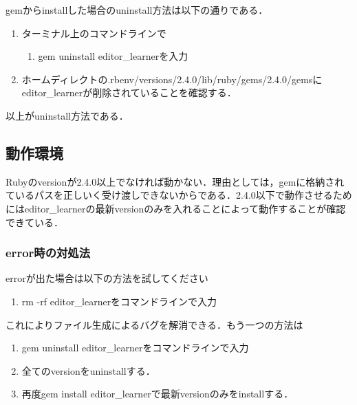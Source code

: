 \documentclass[11pt,dvipdfmx]{jsarticle}
\providecommand{\tightlist}{%
      \setlength{\itemsep}{0pt}\setlength{\parskip}{0pt}}
\begin{document}
gemからinstallした場合のuninstall方法は以下の通りである．

\begin{enumerate}
\def\labelenumi{\arabic{enumi}.}
\tightlist
\item
  ターミナル上のコマンドラインで

  \begin{enumerate}
  \def\labelenumii{\arabic{enumii}.}
  \setcounter{enumii}{1}
  \tightlist
  \item
    gem uninstall editor\_learnerを入力
  \end{enumerate}
\item
  ホームディレクトの.rbenv/versions/2.4.0/lib/ruby/gems/2.4.0/gemsにeditor\_learnerが削除されていることを確認する．
\end{enumerate}

以上がuninstall方法である．

    \subsection{動作環境}\label{ux52d5ux4f5cux74b0ux5883}

    Rubyのversionが2.4.0以上でなければ動かない．理由としては，gemに格納されているパスを正しいく受け渡しできないからである．2.4.0以下で動作させるためにはeditor\_learnerの最新versionのみを入れることによって動作することが確認できている．

\subsubsection{error時の対処法}\label{errorux6642ux306eux5bfeux51e6ux6cd5}

errorが出た場合は以下の方法を試してください

\begin{enumerate}
\def\labelenumi{\arabic{enumi}.}
\tightlist
\item
  rm -rf editor\_learnerをコマンドラインで入力
\end{enumerate}

これによりファイル生成によるバグを解消できる．もう一つの方法は

\begin{enumerate}
\def\labelenumi{\arabic{enumi}.}
\tightlist
\item
  gem uninstall editor\_learnerをコマンドラインで入力
\item
  全てのversionをuninstallする．
\item
  再度gem install editor\_learnerで最新versionのみをinstallする．
\end{enumerate}
\end{document}
